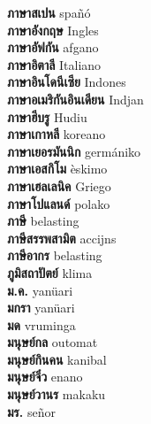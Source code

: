 \textbf{ ภาษาสเปน  } spañó \\
\textbf{ ภาษาอังกฤษ  } Ingles \\
\textbf{ ภาษาอัฟกัน  } afgano \\
\textbf{ ภาษาอิตาลี  } Italiano \\
\textbf{ ภาษาอินโดนีเซีย  } Indones \\
\textbf{ ภาษาอเมริกันอินเดียน  } Indjan \\
\textbf{ ภาษาฮีบรู  } Hudiu \\
\textbf{ ภาษาเกาหลี  } koreano \\
\textbf{ ภาษาเยอรมันนิก  } germániko \\
\textbf{ ภาษาเอสกิโม  } èskimo \\
\textbf{ ภาษาเฮลเลนิค  } Griego \\
\textbf{ ภาษาโปแลนด์  } polako \\
\textbf{ ภาษี  } belasting \\
\textbf{ ภาษีสรรพสามิต  } accijns \\
\textbf{ ภาษีอากร  } belasting \\
\textbf{ ภูมิสถาปัตย์  } klima \\
\textbf{ ม.ค.  } yanüari \\
\textbf{ มกรา  } yanüari \\
\textbf{ มด  } vruminga \\
\textbf{ มนุษย์กล  } outomat \\
\textbf{ มนุษย์กินคน  } kanibal \\
\textbf{ มนุษย์จิ๋ว  } enano \\
\textbf{ มนุษย์วานร  } makaku \\
\textbf{ มร.  } señor \\
